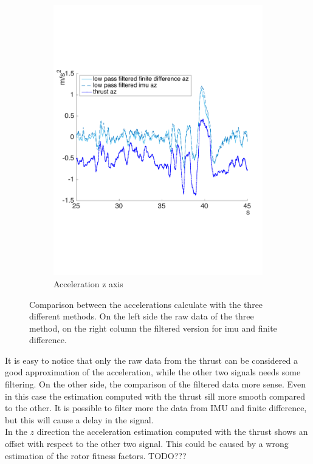\begin{figure}[!htbp]
\begin{subfigure}[b]{0.45\textwidth}
     \includegraphics[width=\textwidth]{img/acc_z.pdf}
        \caption{Acceleration z axis}
        \label{fig:comparison_accz_fil}
   \end{subfigure}
    \caption{Comparison between the accelerations calculate with the three different methods. On the left side the raw data of the three method, on the right column the filtered version for imu and finite difference.}
    \label{fig:comparison_acc}
\end{figure}
It is easy to notice that only the raw data from the thrust can be considered a good approximation of the acceleration, while the other two signals needs some filtering. On the other side, the comparison of the filtered data more sense. Even in this case the estimation computed with the thrust sill more smooth compared to the other. It is possible to filter more the data from IMU and finite difference, but this will cause a delay in the signal.\\

In the $z$ direction the acceleration estimation computed with the thrust shows an offset with respect to the other two signal. This could be caused by a wrong estimation of the rotor fitness factors. TODO???


